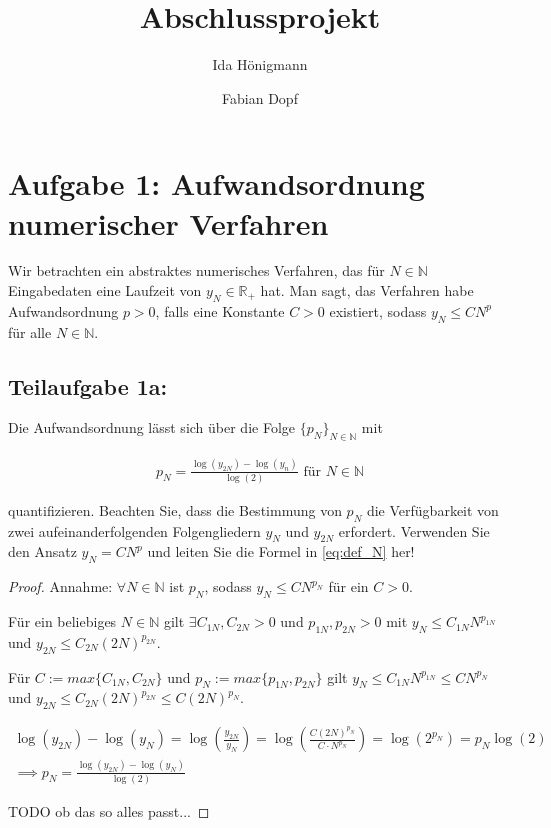 \documentclass[]{article}
\title{Abschlussprojekt}
\author{Ida Hönigmann \and Fabian Dopf}
\begin{document}
\maketitle

\section*{Aufgabe 1: Aufwandsordnung numerischer Verfahren}
Wir betrachten ein abstraktes numerisches Verfahren, das für $N \in \mathbb{N}$ Eingabedaten eine Laufzeit von $y_N \in \mathbb{R}_+$ hat. Man sagt, das Verfahren habe Aufwandsordnung $p > 0$, falls eine Konstante $C > 0$ existiert, sodass $y_N \leq C N^p$ für alle $N \in \mathbb{N}$.

\subsection*{Teilaufgabe 1a:}
Die Aufwandsordnung lässt sich über die Folge $\{p_N\}_{N \in \mathbb{N}}$ mit

\begin{align}
	\label{eq:def_N}
	p_N = \frac{\log(y_{2N})-\log(y_n)}{\log(2)} \text{ für } N \in \mathbb{N}
\end{align}

quantifizieren. Beachten Sie, dass die Bestimmung von $p_N$ die Verfügbarkeit von zwei aufeinanderfolgenden Folgengliedern $y_N$ und $y_{2N}$ erfordert. Verwenden Sie den Ansatz $y_N = CN^p$ und leiten Sie die Formel in \ref{eq:def_N} her!

\begin{proof}
	Annahme: $\forall N \in \mathbb{N}$ ist $p_N$, sodass $y_N \leq C N^{p_N}$ für ein $C > 0$.
	
	Für ein beliebiges $N \in \mathbb{N}$ gilt $\exists C_{1N}, C_{2N} > 0$ und $p_{1N}, p_{2N} > 0$ mit $y_N \leq C_{1N} N^{p_{1N}}$ und $y_{2N} \leq C_{2N} (2N)^{p_{2N}}$.
	
	Für $C:=max\{C_{1N}, C_{2N}\}$ und $p_N:=max\{p_{1N}, p_{2N}\}$ gilt $y_N \leq C_{1N} N^{p_{1N}} \leq C N^{p_N}$ und $y_{2N} \leq C_{2N} (2N)^{p_{2N}} \leq C (2N)^{p_N}$.
	 
	\begin{align}
		\log(y_{2N}) - \log(y_N) = \log\left(\frac{y_{2N}}{y_N}\right) = \log\left(\frac{C(2N)^{p_N}}{C\cdot N^{p_N}}\right) = \log(2^{p_N}) = p_N \log(2) \\
		\implies p_N = \frac{\log(y_{2N}) - \log(y_N)}{\log(2)}
	\end{align}

	TODO ob das so alles passt...

\end{proof}
\end{document}
